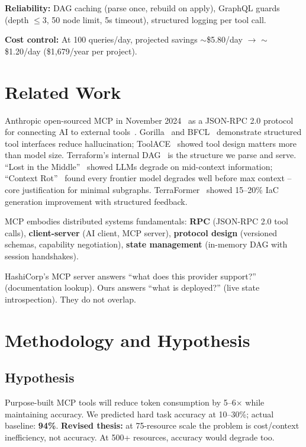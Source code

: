 \documentclass[10pt,twocolumn]{article}
\begin{document}
\textbf{Reliability:} DAG caching (parse once, rebuild on apply), GraphQL guards (depth $\leq 3$, 50 node limit, 5s timeout), structured logging per tool call.

\textbf{Cost control:} At 100 queries/day, projected savings $\sim$\$5.80/day $\to$ $\sim$\$1.20/day (\$1,679/year per project).

\section{Related Work}

Anthropic open-sourced MCP in November 2024~\cite{mcp} as a JSON-RPC 2.0 protocol for connecting AI to external tools~\cite{spec}. Gorilla~\cite{gorilla} and BFCL~\cite{bfcl} demonstrate structured tool interfaces reduce hallucination; ToolACE~\cite{toolace} showed tool design matters more than model size. Terraform's internal DAG~\cite{tfgraph} is the structure we parse and serve. ``Lost in the Middle''~\cite{lost} showed LLMs degrade on mid-context information; ``Context Rot''~\cite{rot} found every frontier model degrades well before max context -- core justification for minimal subgraphs. TerraFormer~\cite{terraformer} showed 15--20\% IaC generation improvement with structured feedback.

MCP embodies distributed systems fundamentals: \textbf{RPC} (JSON-RPC 2.0 tool calls), \textbf{client-server} (AI client, MCP server), \textbf{protocol design} (versioned schemas, capability negotiation), \textbf{state management} (in-memory DAG with session handshakes).

HashiCorp's MCP server answers ``what does this provider support?'' (documentation lookup). Ours answers ``what is deployed?'' (live state introspection). They do not overlap.

\section{Methodology and Hypothesis}

\subsection{Hypothesis}

Purpose-built MCP tools will reduce token consumption by 5--6$\times$ while maintaining accuracy. We predicted hard task accuracy at 10--30\%; actual baseline: \textbf{94\%}. \textbf{Revised thesis:} at 75-resource scale the problem is cost/context inefficiency, not accuracy. At 500+ resources, accuracy would degrade too.
\end{document}
